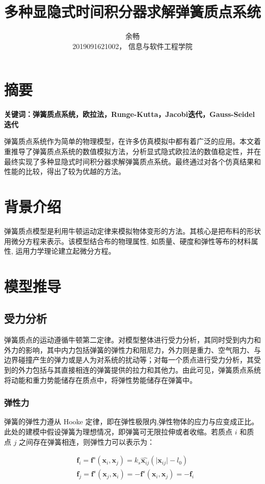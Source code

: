 \documentclass[UTF8]{ctexart}
\title{多种显隐式时间积分器求解弹簧质点系统}
\author{余畅 \\ 2019091621002， 信息与软件工程学院}
\begin{document}
\maketitle

\section{摘要}
\textbf{关键词：弹簧质点系统，欧拉法，Runge-Kutta，Jacobi迭代，Gauss-Seidel迭代} \par
弹簧质点系统作为简单的物理模型，在许多仿真模拟中都有着广泛的应用。本文着重推导了弹簧质点系统的数值模拟方法，分析显式隐式欧拉法的数值稳定性，并在最终实现了多种显隐式时间积分器求解弹簧质点系统。最终通过对各个仿真结果和性能的比较，得出了较为优越的方法。

\section{背景介绍}
弹簧质点模型是利用牛顿运动定律来模拟物体变形的方法。其核心是把布料的形状用微分方程来表示。该模型结合布的物理属性, 如质量、硬度和弹性等布的材料属性, 运用力学理论建立起微分方程。

\section{模型推导}

\subsection{受力分析}

弹簧质点的运动遵循牛顿第二定律。对模型整体进行受力分析，其同时受到内力和外力的影响，其中内力包括弹簧的弹性力和阻尼力，外力则是重力、空气阻力、与边界碰撞产生的弹力或是人为对系统的扰动等；对每一个质点进行受力分析，其受到的外力包括与其直接相连的弹簧提供的拉力和其他力。由此可见，弹簧质点系统将动能和重力势能储存在质点中，将弹性势能储存在弹簧中。\par

\subsubsection{弹性力}

弹簧的弹性力遵从 Hooke 定律，即在弹性极限内,弹性物体的应力与应变成正比。此处的建模中假设弹簧为理想情况，即弹簧可无限拉伸或者收缩。若质点 $i$ 和质点 $j$ 之间存在弹簧相连，则弹性力可以表示为：

\begin{large}
\begin{equation}
\begin{split}
&\mathbf{f}_i = \mathbf{f}^s(\mathbf{x}_i, \mathbf{x}_j)=k_s \widehat{\mathbf{x}_{ij}} (\lvert \mathbf{x}_{ij} \rvert - l_0) \\
&\mathbf{f}_j = \mathbf{f}^s(\mathbf{x}_j, \mathbf{x}_i)=-\mathbf{f}^s(\mathbf{x}_i, \mathbf{x}_j)=-\mathbf{f}_i
\end{split}
\end{equation}
\end{large}
\end{document}
